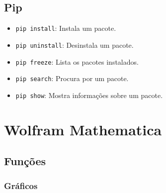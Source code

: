 \documentclass[a4paper, 12pt]{article}
\begin{document}
\subsection{Pip}\label{pip}

\begin{itemize}
    \item \texttt{pip install}: Instala um pacote.
    \item \texttt{pip uninstall}: Desinstala um pacote.
    \item \texttt{pip freeze}: Lista os pacotes instalados.
    \item \texttt{pip search}: Procura por um pacote.
    \item \texttt{pip show}: Mostra informações sobre um pacote.
\end{itemize}

\section{Wolfram Mathematica}\label{wolfram-mathematica}

\subsection{Funções}\label{funcoes}

\subsubsection{Gráficos}\label{graficos}
\end{document}
